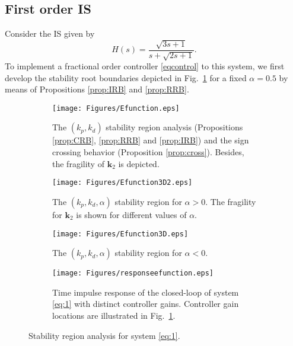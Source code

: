 \documentclass[twoside,reqno,11pt]{fcaa-var} %
\begin{document}
\subsection{First order IS}
Consider the IS given by
\begin{equation}
H(s)=\frac{\sqrt{3s+1}}{s+\sqrt{2s+1}}. \label{eq:1}
\end{equation}
To implement a fractional order controller \eqref{eqcontrol} to this system, we first develop the stability root boundaries depicted in Fig.~\ref{SRegion2a} for a fixed $\alpha=0.5$ by means of Propositions \ref{prop:IRB} and \ref{prop:RRB}.\par
\begin{figure}%
	\centering %
	\begin{subfigure}[b]{0.48\columnwidth}
		\centering
		\texttt{[image: Figures/Efunction.eps]}
		\caption{The $(k_p,k_d)$ stability region analysis (Propositions \ref{prop:CRB}, \ref{prop:RRB} and \ref{prop:IRB}) and  the sign crossing behavior (Proposition \ref{prop:cross}). Besides, the fragility of $\mathbf{k}_2$ is depicted.}
		\label{SRegion2a}
	\end{subfigure}
	\hfill
	\begin{subfigure}[b]{0.48\columnwidth}
		\centering
		\texttt{[image: Figures/Efunction3D2.eps]}
		\caption{The $(k_p,k_d,\alpha)$ stability region for $\alpha>0$. The fragility for  $\mathbf{k}_2$ is shown for different values of $\alpha$.}
		\label{SRegion2c}
	\end{subfigure}
	\hfill
	\begin{subfigure}[b]{0.48\columnwidth}
	\centering
	\texttt{[image: Figures/Efunction3D.eps]}
	\caption{The $(k_p,k_d,\alpha)$ stability region for $\alpha<0$.}
	\label{SRegion2b}
\end{subfigure}
\hfill
\begin{subfigure}[b]{0.48\columnwidth}
	\centering
	\texttt{[image: Figures/responseefunction.eps]}
	\caption{Time impulse response of the closed-loop of system \eqref{eq:1} with distinct controller gains. Controller gain locations are illustrated in Fig.~\ref{SRegion2a}.}
	\label{Responseefunction}
\end{subfigure}
	\caption{Stability region analysis for system \eqref{eq:1}.}\label{SRegion2}
\end{figure}
\end{document}
